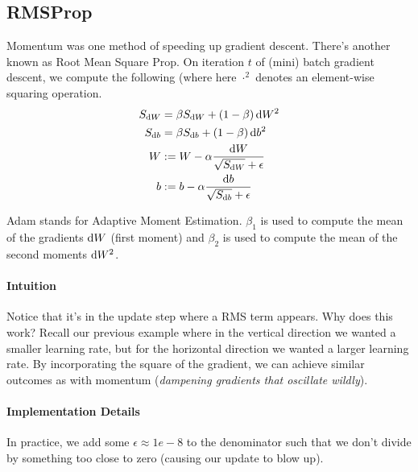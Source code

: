 \documentclass[12pt]{article}
\begin{document}
\subsection{RMSProp} Momentum was one method of speeding up gradient descent. There's another known as Root Mean Square Prop. On iteration $t$ of (mini) batch gradient descent, we compute the following (where here $\cdot^2$ denotes an element-wise squaring operation.
\begin{align*}   S_{\d W} &= \beta S_{\d W} + (1-\beta) \d W^2 \\ %
  S_{\d b} &= \beta S_{\d b} + (1-\beta) \d b^2 \\ %
  W &:= W - \alpha \frac{\d W}{\sqrt{S_{\d W}} + \epsilon} \\
  b &:= b - \alpha \frac{\d b}{\sqrt{S_{\d b}} + \epsilon} \end{align*}

Adam stands for Adaptive Moment Estimation. $\beta_1$ is used to compute the mean of the gradients $\operatorname{d}\!{W}$ (first moment) and $\beta_2$ is used to compute the mean of the second moments $\operatorname{d}\!{W}^2$.

\paragraph{Intuition}
Notice that it's in the update step where a RMS term appears.
Why does this work? Recall our previous example where in the vertical direction we wanted a smaller learning rate, but for the horizontal direction we wanted a larger learning rate. By incorporating the square of the gradient, we can achieve similar outcomes as with momentum (\emph{dampening gradients that oscillate wildly}).

\paragraph{Implementation Details} In practice, we add some $\epsilon \approx 1e-8$ to the denominator such that we don't divide by something too close to zero (causing our update to blow up).
\end{document}

